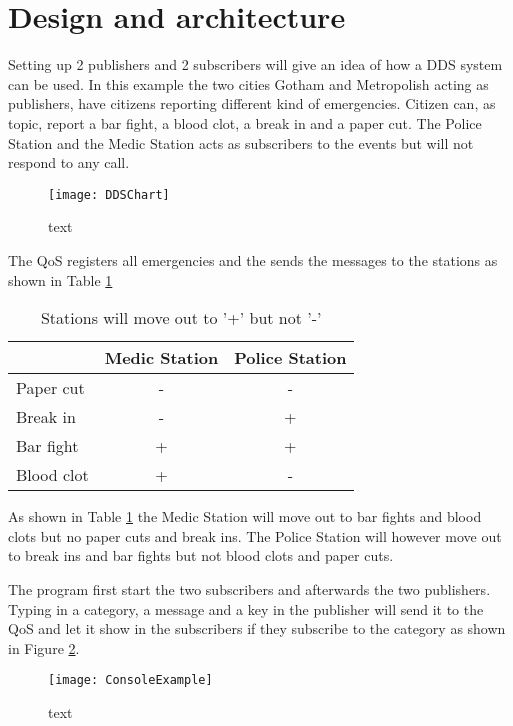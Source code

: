 \documentclass[Main]{subfiles}
\begin{document}
\section{Design and architecture}
Setting up 2 publishers and 2 subscribers will give an idea of how a DDS system can be used.
In this example the two cities Gotham and Metropolish acting as publishers, have citizens reporting different kind of emergencies.
Citizen can, as topic, report a bar fight, a blood clot, a break in and a paper cut.
The Police Station and the Medic Station acts as subscribers to the events but will not respond to any call.


\begin{figure}[hbtp]
\centering
\texttt{[image: DDSChart]}
\caption{text}
\label{Fig:pub-sub}
\end{figure}

The QoS registers all emergencies and the sends the messages to the stations as shown in Table \ref{tab:emergencies}
\begin{table}[htbp]
\centering

\begin{tabular}{l|c|c}
 & Medic Station & Police Station \\ 
\hline 
Paper cut & - & - \\ 
Break in & - & + \\ 
Bar fight & + & + \\ 
Blood clot & + & - \\ 
\hline 
\end{tabular} 

\caption{Stations will move out to '+' but not '-'}
\label{tab:emergencies}
\end{table}

As shown in Table \ref{tab:emergencies} the Medic Station will move out to bar fights and blood clots but no paper cuts and break ins.
The Police Station will however move out to break ins and bar fights but not blood clots and paper cuts.

The program first start the two subscribers and afterwards the two publishers.
Typing in a category, a message and a key in the publisher will send it to the QoS and let it show in the subscribers if they subscribe to the category as shown in Figure \ref{Fig:example}.


\begin{figure}[hbtp]
\centering
\texttt{[image: ConsoleExample]}
\caption{text}
\label{Fig:example}
\end{figure}
\end{document}
